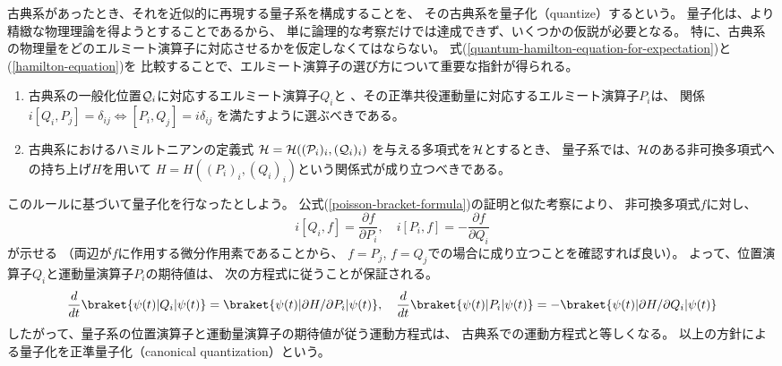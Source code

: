 古典系があったとき、それを近似的に再現する量子系を構成することを、
その古典系を量子化（quantize）するという。
量子化は、より精緻な物理理論を得ようとすることであるから、
単に論理的な考察だけでは達成できず、いくつかの仮説が必要となる。
特に、古典系の物理量をどのエルミート演算子に対応させるかを仮定しなくてはならない。
式(\ref{quantum-hamilton-equation-for-expectation})と(\ref{hamilton-equation})を
比較することで、エルミート演算子の選び方について重要な指針が得られる。
\begin{enumerate}
  \item
  古典系の一般化位置$\mathcal{Q}_i$に対応するエルミート演算子$Q_i$と
  、その正準共役運動量に対応するエルミート演算子$P_i$は、
  関係$i[Q_i,P_j]=\delta_{ij} \iff [P_i,Q_j]=i\delta_{ij}$
  を満たすように選ぶべきである。
  \item
  古典系におけるハミルトニアンの定義式
  $\mathcal{H}=\mathcal{H}((\mathcal{P}_i)_i,(\mathcal{Q}_i)_i)$
  を与える多項式を$\mathcal{H}$とするとき、
  量子系では、$\mathcal{H}$のある非可換多項式への持ち上げ$H$を用いて
  $H=H((P_i)_i,(Q_i)_i)$という関係式が成り立つべきである。
\end{enumerate}
このルールに基づいて量子化を行なったとしよう。
公式(\ref{poisson-bracket-formula})の証明と似た考察により、
非可換多項式$f$に対し、
\begin{equation}
i[Q_i,f]=\frac{\partial f}{\partial P_i}, \quad
i[P_i,f]=-\frac{\partial f}{\partial Q_i}
\end{equation}
が示せる
（両辺が$f$に作用する微分作用素であることから、
$f=P_j$, $f=Q_j$での場合に成り立つことを確認すれば良い）。
よって、位置演算子$Q_i$と運動量演算子$P_i$の期待値は、
次の方程式に従うことが保証される。
\begin{equation}
  \frac{d}{dt}\braket{\psi(t)|Q_i|\psi(t)}
  = \braket{\psi(t)|\partial H / \partial P_i|\psi(t)}, \quad
  \frac{d}{dt}\braket{\psi(t)|P_i|\psi(t)}
  = -\braket{\psi(t)|\partial H / \partial Q_i|\psi(t)}
\end{equation}
したがって、量子系の位置演算子と運動量演算子の期待値が従う運動方程式は、
古典系での運動方程式と等しくなる。
以上の方針による量子化を正準量子化（canonical quantization）という。

